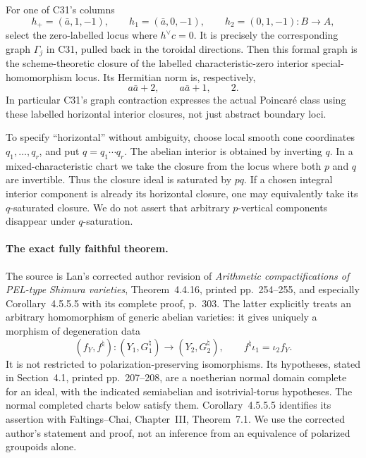 \documentclass[11pt]{article}
\theoremstyle{definition}\newtheorem{definition}[theorem]{Definition}\newtheorem{remark}[theorem]{Remark}
\begin{document}
For one of C31's columns
\[
 h_+=(\bar a,1,-1),\qquad
 h_1=(\bar a,0,-1),\qquad h_2=(0,1,-1):B\longrightarrow A,
                                                        \tag{C33a}
\]
select the zero-labelled locus where $h^\vee c=0$.
It is precisely the corresponding graph $\Gamma_j$ in
C31, pulled back in the toroidal directions. Then this
formal graph is the scheme-theoretic closure of the
labelled characteristic-zero interior special-homomorphism
locus. Its Hermitian norm is, respectively,
\[
              a\bar a+2,\qquad a\bar a+1,\qquad 2.
                                                        \tag{C33b}
\]
In particular C31's graph contraction expresses the actual
Poincar\'e class using these labelled horizontal interior
closures, not just abstract boundary loci.

To specify ``horizontal'' without ambiguity, choose local
smooth cone coordinates $q_1,\ldots,q_r$, and put
$q=q_1\cdots q_r$. The abelian interior is obtained by
inverting $q$. In a mixed-characteristic chart we take
the closure from the locus where both $p$ and $q$ are
invertible. Thus the closure ideal is saturated by $pq$.
If a chosen integral interior component is already its
horizontal closure, one may equivalently take its
$q$-saturated closure. We do not assert that arbitrary
$p$-vertical components disappear under $q$-saturation.

\paragraph{The exact fully faithful theorem.}
The source is Lan's corrected author revision of
\emph{Arithmetic compactifications of PEL-type Shimura
varieties}, Theorem~4.4.16, printed pp.~254--255, and
especially Corollary~4.5.5.5 with its complete proof,
p.~303. The latter explicitly treats an arbitrary
homomorphism of generic abelian varieties: it gives
uniquely a morphism of degeneration data
\[
 (f_Y,f^{\natural}):(Y_1,G_1^{\natural})
                     \longrightarrow(Y_2,G_2^{\natural}),
 \qquad f^{\natural}\iota_1=\iota_2f_Y.                 \tag{C33c}
\]
It is not restricted to polarization-preserving
isomorphisms. Its hypotheses, stated in Section~4.1,
printed pp.~207--208, are a noetherian normal domain
complete for an ideal, with the indicated semiabelian
and isotrivial-torus hypotheses. The normal completed
charts below satisfy them. Corollary~4.5.5.5 identifies
its assertion with Faltings--Chai, Chapter~III,
Theorem~7.1. We use the corrected author's statement
and proof, not an inference from an equivalence of
polarized groupoids alone.
\end{document}
